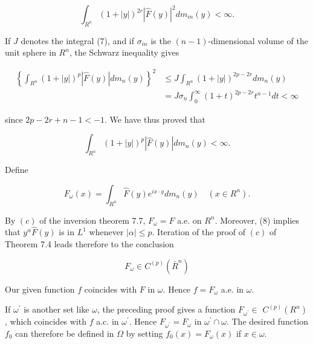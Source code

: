 \documentclass[10pt]{article}
\begin{document}
$$
\int_{R^{n}}(1+|y|)^{2 r}|\hat{F}(y)|^{2} d m_{i n}(y)<\infty .
$$

If $J$ denotes the integral (7), and if $\sigma_{i n}$ is the $(n-1)$-dimensional volume of the unit sphere in $R^{n}$, the Schwarz inequality gives

$$
\begin{aligned}
\left\{\int_{R^{n}}(1+|y|)^{p}|\hat{F}(y)| d m_{n}(y)\right\}^{2} & \leq J \int_{R^{n}}(1+|y|)^{2 p-2 r} d m_{n}(y) \\
& =J \sigma_{n} \int_{0}^{\infty}(1+t)^{2 p-2 r} t^{n-1} d t<\infty
\end{aligned}
$$

since $2 p-2 r+n-1<-1$. We have thus proved that

$$
\int_{R^{n}}(1+|y|)^{p}|\hat{F}(y)| d m_{n}(y)<\infty .
$$

Define

$$
F_{\omega}(x)=\int_{R^{n}} \hat{F}(y) e^{i x \cdot y} d m_{n}(y) \quad\left(x \in R^{n}\right) .
$$

By $(c)$ of the inversion theorem 7.7, $F_{\omega}=F$ a.e. on $R^{n}$. Moreover, (8) implies that $y^{\alpha} \widehat{F}(y)$ is in $L^{1}$ whenever $|\alpha| \leq p$. Iteration of the proof of $(c)$ of Theorem 7.4 leads therefore to the conclusion

$$
F_{\omega} \in C^{(p)}\left(\bar{R}^{n}\right)
$$

Our given function $f$ coincides with $F$ in $\omega$. Hence $f=F_{\omega}$ a.e. in $\omega$.

If $\omega^{\prime}$ is another set like $\omega$, the preceding proof gives a function $F_{\omega^{\prime}} \in$ $C^{(p)}\left(R^{n}\right)$, which coincides with $f$ a.c. in $\omega^{\prime}$. Hence $F_{\omega^{\prime}}=F_{\omega}$ in $\omega^{\prime} \cap \omega$. The desired function $f_{0}$ can therefore be defined in $\Omega$ by setting $f_{0}(x)=F_{\omega}(x)$ if $x \in \omega$.
\end{document}
